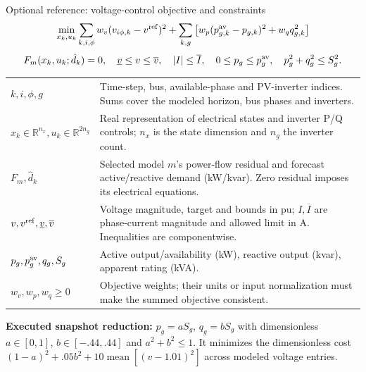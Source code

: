 \begin{frame}[t]{Optional reference: voltage-control objective and constraints}
\[
\min_{x_k,u_k}\sum_{k,i,\phi}w_v(v_{i\phi,k}-v^{\rm ref})^2
+\sum_{k,g}\big[w_p(p^{\rm av}_{g,k}-p_{g,k})^2+w_q q_{g,k}^2\big]
\]
\[
F_m(x_k,u_k;\hat d_k)=0,\quad \underline v\leq v\leq\overline v,\quad
|I|\leq\overline I,\quad 0\leq p_g\leq p_g^{\rm av},\quad p_g^2+q_g^2\leq S_g^2.
\]
\begin{tabular}{@{}>{\raggedright\arraybackslash}p{.25\linewidth}>{\raggedright\arraybackslash}p{.68\linewidth}@{}}
$k,i,\phi,g$ & Time-step, bus, available-phase and PV-inverter indices. Sums cover the modeled horizon, bus phases and inverters. \\
$x_k\in\mathbb R^{n_x},u_k\in\mathbb R^{2n_g}$ & Real representation of electrical states and inverter P/Q controls; $n_x$ is the state dimension and $n_g$ the inverter count. \\
$F_m,\hat d_k$ & Selected model $m$'s power-flow residual and forecast active/reactive demand (kW/kvar). Zero residual imposes its electrical equations. \\
$v,v^{\rm ref},\underline v,\overline v$ & Voltage magnitude, target and bounds in pu; $I,\overline I$ are phase-current magnitude and allowed limit in A. Inequalities are componentwise. \\
$p_g,p_g^{\rm av},q_g,S_g$ & Active output/availability (kW), reactive output (kvar), apparent rating (kVA). \\
$w_v,w_p,w_q\geq0$ & Objective weights; their units or input normalization must make the summed objective consistent. \\
\end{tabular}
\par\smallskip\textbf{Executed snapshot reduction:} $p_g=aS_g$, $q_g=bS_g$ with dimensionless $a\in[0,1]$, $b\in[-.44,.44]$ and $a^2+b^2\leq1$. It minimizes the dimensionless cost $(1-a)^2+.05b^2+10\operatorname{mean}[(v-1.01)^2]$ across modeled voltage entries.
\end{frame}

